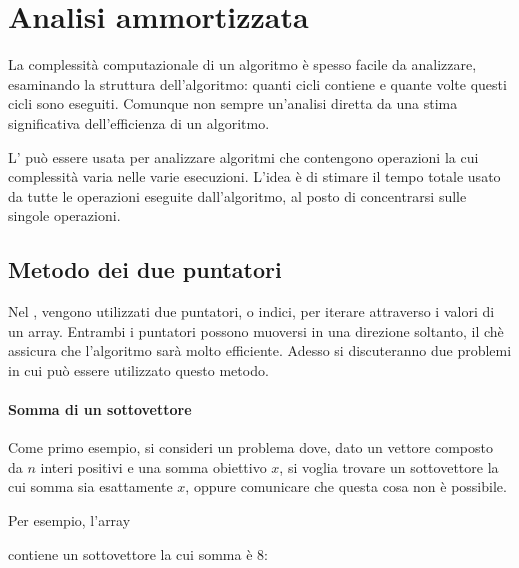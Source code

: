 \chapter{Analisi ammortizzata}


La complessità computazionale di un algoritmo
è spesso facile da analizzare, 
esaminando la struttura dell'algoritmo:
quanti cicli contiene e quante volte 
questi cicli sono eseguiti.
Comunque non sempre un'analisi diretta
da una stima significativa dell'efficienza di un algoritmo.

L' può essere usata per analizzare
algoritmi che contengono operazioni la 
cui complessità varia nelle varie esecuzioni.
L'idea è di stimare il tempo totale usato
da tutte le operazioni eseguite dall'algoritmo,
al posto di concentrarsi sulle singole operazioni.

\section{Metodo dei due puntatori}


Nel ,
vengono utilizzati due puntatori, o indici, 
per iterare attraverso i valori di un array.
Entrambi i puntatori possono muoversi in una direzione soltanto,
il chè assicura che l'algoritmo sarà molto efficiente.
Adesso si discuteranno due problemi in cui
può essere utilizzato questo metodo.

\subsubsection{Somma di un sottovettore}

Come primo esempio,
si consideri un problema dove,
dato un vettore composto da $n$ interi positivi
e una somma obiettivo $x$,
si voglia trovare un sottovettore la cui somma sia
esattamente $x$, oppure comunicare che questa cosa non è possibile.

Per esempio, l'array
\begin{center}
\end{center}
contiene un sottovettore la cui somma è 8:
\begin{center}
\end{center}

